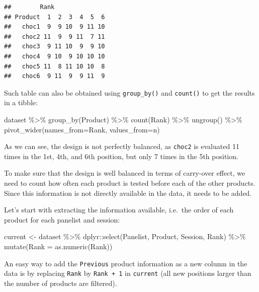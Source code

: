 \documentclass[
]{krantz}
\makeatletter
\newenvironment{Shaded}{\begin{snugshade}}{\end{snugshade}}
\newcommand{\AttributeTok}[1]{\textcolor[rgb]{0.61,0.61,0.61}{#1}}
\newcommand{\FunctionTok}[1]{\textcolor[rgb]{0,0,0}{#1}}
\newcommand{\NormalTok}[1]{#1}
\newcommand{\OtherTok}[1]{\textcolor[rgb]{0.37,0.37,0.37}{#1}}
\newcommand{\SpecialCharTok}[1]{\textcolor[rgb]{0,0,0}{#1}}
\newenvironment{kframe}{%
\medskip{}
\setlength{\fboxsep}{.8em}
 \def\at@end@of@kframe{}%
 \ifinner\ifhmode%
  \def\at@end@of@kframe{\end{minipage}}%
  \begin{minipage}{\columnwidth}%
 \fi\fi%
 \def\FrameCommand##1{\hskip\@totalleftmargin \hskip-\fboxsep
 \colorbox{shadecolor}{##1}\hskip-\fboxsep
     \hskip-\linewidth \hskip-\@totalleftmargin \hskip\columnwidth}%
 \MakeFramed {\advance\hsize-\width
   \@totalleftmargin\z@ \linewidth\hsize
   \@setminipage}}%
 {\par\unskip\endMakeFramed%
 \at@end@of@kframe}
\renewenvironment{Shaded}{\begin{kframe}}{\end{kframe}}
\makeatother
\begin{document}
\begin{verbatim}
##        Rank
## Product  1  2  3  4  5  6
##   choc1  9  9 10  9 11 10
##   choc2 11  9  9 11  7 11
##   choc3  9 11 10  9  9 10
##   choc4  9 10  9 10 10 10
##   choc5 11  8 11 10 10  8
##   choc6  9 11  9  9 11  9
\end{verbatim}

Such table can also be obtained using \texttt{group\_by()} and \texttt{count()} to get the results in a tibble:

\begin{Shaded}
\begin{Highlighting}[]
\NormalTok{dataset }\SpecialCharTok{\%\textgreater{}\%} 
  \FunctionTok{group\_by}\NormalTok{(Product) }\SpecialCharTok{\%\textgreater{}\%} 
  \FunctionTok{count}\NormalTok{(Rank) }\SpecialCharTok{\%\textgreater{}\%} 
  \FunctionTok{ungroup}\NormalTok{() }\SpecialCharTok{\%\textgreater{}\%} 
  \FunctionTok{pivot\_wider}\NormalTok{(}\AttributeTok{names\_from=}\NormalTok{Rank, }\AttributeTok{values\_from=}\NormalTok{n)}
\end{Highlighting}
\end{Shaded}

As we can see, the design is not perfectly balanced, as \texttt{choc2} is evaluated 11 times in the 1st, 4th, and 6th position, but only 7 times in the 5th position.

To make sure that the design is well balanced in terms of carry-over effect, we need to count how often each product is tested before each of the other products. Since this information is not directly available in the data, it needs to be added.

Let's start with extracting the information available, i.e.~the order of each product for each panelist and session:

\begin{Shaded}
\begin{Highlighting}[]
\NormalTok{current }\OtherTok{\textless{}{-}}\NormalTok{ dataset }\SpecialCharTok{\%\textgreater{}\%} 
\NormalTok{  dplyr}\SpecialCharTok{::}\FunctionTok{select}\NormalTok{(Panelist, Product, Session, Rank) }\SpecialCharTok{\%\textgreater{}\%} 
  \FunctionTok{mutate}\NormalTok{(}\AttributeTok{Rank =} \FunctionTok{as.numeric}\NormalTok{(Rank))}
\end{Highlighting}
\end{Shaded}

An easy way to add the \texttt{Previous} product information as a new column in the data is by replacing \texttt{Rank} by \texttt{Rank\ +\ 1} in \texttt{current} (all new positions larger than the number of products are filtered).
\end{document}
